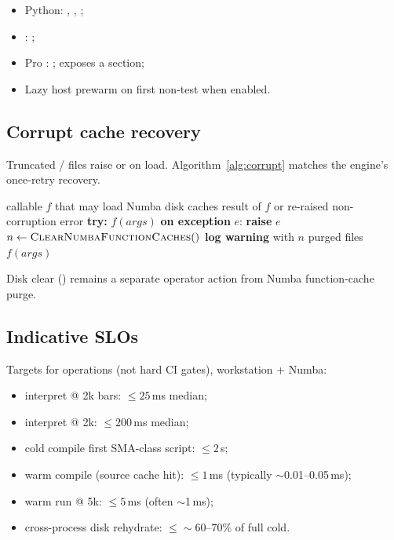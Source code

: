 \documentclass[11pt,a4paper]{article}
\begin{document}
\begin{itemize}[leftmargin=*]
  \item Python: , ,
        ;
  \item \cli{}: ;
  \item Pro \api{}: ;  exposes a
         section;
  \item Lazy host prewarm on first non-test  when enabled.
\end{itemize}

\subsection{Corrupt cache recovery}

Truncated / files raise  or
 on load. Algorithm~\ref{alg:corrupt} matches
the engine's once-retry recovery.

\begin{algorithm}[t]
\caption{\textsc{CorruptCacheRecovery}($f$, args)}
\label{alg:corrupt}
\begin{algorithmic}[1]
\Require callable $f$ that may load Numba disk caches
\Ensure result of $f$ or re-raised non-corruption error
\State \textbf{try:} \Return $f(\textit{args})$
\State \textbf{on exception} $e$:
  \State \textbf{raise} $e$
\EndIf
\State $n \gets \textsc{ClearNumbaFunctionCaches}()$
\State \textbf{log warning} with $n$ purged files
\State \Return $f(\textit{args})$ 
\end{algorithmic}
\end{algorithm}

Disk \ir{} clear () remains a separate
operator action from Numba function-cache purge.

\subsection{Indicative SLOs}

Targets for operations (not hard CI gates), workstation + Numba:
\begin{itemize}[leftmargin=*]
  \item interpret  @ 2k bars: $\le 25$\,ms median;
  \item interpret  @ 2k: $\le 200$\,ms median;
  \item cold compile first SMA-class script: $\le 2$\,s;
  \item warm compile (source cache hit): $\le 1$\,ms (typically
        $\sim$0.01--0.05\,ms);
  \item warm run  @ 5k: $\le 5$\,ms (often $\sim$1\,ms);
  \item cross-process disk rehydrate: $\le\sim$60--70\% of full cold.
\end{itemize}
\end{document}
